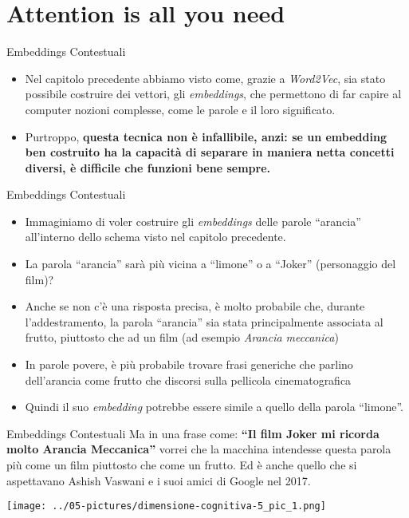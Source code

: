 \documentclass[aspectratio=169]{beamer}
\begin{document}
%
\section{Attention is all you need}
%
%
\begin{frame}{Embeddings Contestuali}
\begin{itemize}
\item    Nel capitolo precedente abbiamo visto come, grazie a \emph{Word2Vec},
sia stato possibile costruire dei vettori, gli \emph{embeddings}, che
permettono di far capire al computer nozioni complesse, come le parole e
il loro significato.
\item Purtroppo, \textbf{questa tecnica non è infallibile, anzi: se un
embedding ben costruito ha la capacità di separare in maniera netta
concetti diversi, è difficile che funzioni bene sempre.}
\end{itemize}
\end{frame}
%
%
\begin{frame}{Embeddings Contestuali}
\begin{itemize}
\item Immaginiamo di voler costruire gli \emph{embeddings} delle parole
``arancia'' all'interno dello schema visto nel capitolo precedente. 
\item La
parola ``arancia'' sarà più vicina a ``limone'' o a ``Joker'' (personaggio del film)? 
\item Anche se non c'è una risposta precisa, è molto probabile che, durante l'addestramento, la parola ``arancia'' sia stata principalmente associata al frutto, piuttosto che ad un film (ad esempio \emph{Arancia meccanica}) 
\item In parole povere, è più probabile trovare frasi generiche che parlino dell'arancia come frutto che discorsi sulla pellicola cinematografica
\item Quindi il suo \emph{embedding} potrebbe essere simile a quello della parola ``limone''.
\end{itemize}
\end{frame}
%
%
\begin{frame}{Embeddings Contestuali}
\vspace{0.5cm}
Ma in una frase come:
\textbf{``Il film Joker mi ricorda molto Arancia Meccanica''}
vorrei che la macchina intendesse questa parola più come un film
piuttosto che come un frutto. Ed è anche quello che si aspettavano
Ashish Vaswani e i suoi amici di Google nel 2017.
\begin{center}
\texttt{[image: ../05-pictures/dimensione-cognitiva-5\_pic\_1.png]} 
\end{center}
\end{frame}
\end{document}
